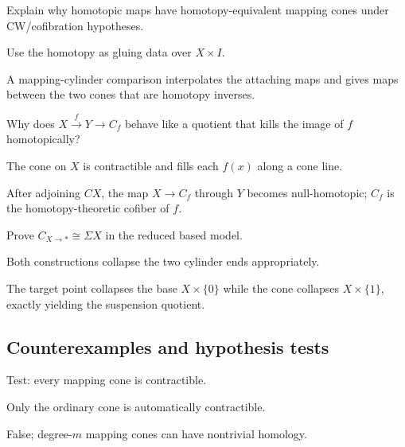 \begin{exercise}\label{exr:viii07-ped-07}
Explain why homotopic maps have homotopy-equivalent mapping cones under CW/cofibration hypotheses.
\end{exercise}
\begin{hint}
Use the homotopy as gluing data over $X\times I$.
\end{hint}
\begin{solution}
A mapping-cylinder comparison interpolates the attaching maps and gives maps between the two cones that are homotopy inverses.
\end{solution}

\begin{exercise}\label{exr:viii07-ped-08}
Why does $X\xrightarrow fY\to C_f$ behave like a quotient that kills the image of $f$ homotopically?
\end{exercise}
\begin{hint}
The cone on $X$ is contractible and fills each $f(x)$ along a cone line.
\end{hint}
\begin{solution}
After adjoining $CX$, the map $X\to C_f$ through $Y$ becomes null-homotopic; $C_f$ is the homotopy-theoretic cofiber of $f$.
\end{solution}

\begin{exercise}\label{exr:viii07-ped-09}
Prove $C_{X\to *}\cong\Sigma X$ in the reduced based model.
\end{exercise}
\begin{hint}
Both constructions collapse the two cylinder ends appropriately.
\end{hint}
\begin{solution}
The target point collapses the base $X\times\{0\}$ while the cone collapses $X\times\{1\}$, exactly yielding the suspension quotient.
\end{solution}

\subsection*{Counterexamples and hypothesis tests}

\begin{exercise}\label{exr:viii07-ped-10}
Test: every mapping cone is contractible.
\end{exercise}
\begin{hint}
Only the ordinary cone is automatically contractible.
\end{hint}
\begin{solution}
False; degree-$m$ mapping cones can have nontrivial homology.
\end{solution}

